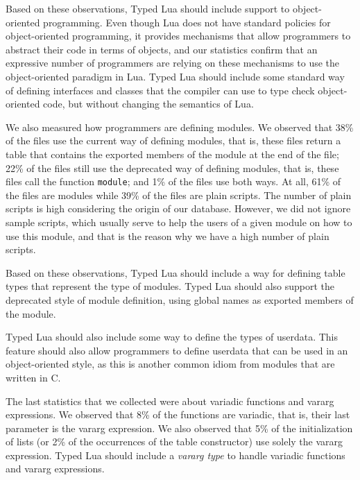 Based on these observations, Typed Lua should include support
to object-oriented programming.
Even though Lua does not have standard policies for object-oriented
programming, it provides mechanisms that allow programmers to
abstract their code in terms of objects, and our statistics confirm
that an expressive number of programmers are relying on these mechanisms
to use the object-oriented paradigm in Lua.
Typed Lua should include some standard way of defining interfaces and classes
that the compiler can use to type check object-oriented code,
but without changing the semantics of Lua.

We also measured how programmers are defining modules.
We observed that 38\% of the files use the current way of defining
modules, that is, these files return a table that contains the
exported members of the module at the end of the file;
22\% of the files still use the deprecated way of defining modules,
that is, these files call the function \texttt{module};
and 1\% of the files use both ways.
At all, 61\% of the files are modules while 39\% of the files are
plain scripts.
The number of plain scripts is high considering the origin of
our database.
However, we did not ignore sample scripts, which usually serve to
help the users of a given module on how to use this module, and
that is the reason why we have a high number of plain scripts.

Based on these observations, Typed Lua should include a way
for defining table types that represent the type of modules.
Typed Lua should also support the deprecated style of module
definition, using global names as exported members of the module.

Typed Lua should also include some way to define the types of
userdata.
This feature should also allow programmers to define userdata
that can be used in an object-oriented style, as this is another
common idiom from modules that are written in C.

The last statistics that we collected were about variadic functions
and vararg expressions.
We observed that 8\% of the functions are variadic, that is,
their last parameter is the vararg expression.
We also observed that 5\% of the initialization of lists
(or 2\% of the occurrences of the table constructor) use solely the
vararg expression.
Typed Lua should include a \emph{vararg type} to handle variadic
functions and vararg expressions.


